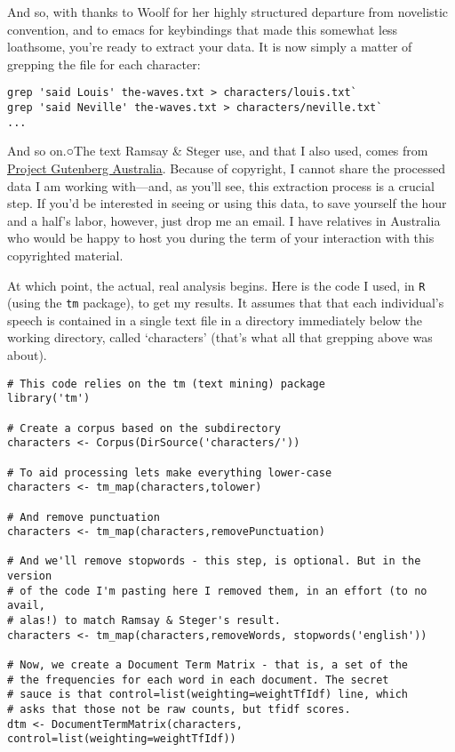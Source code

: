 \documentclass[
  12pt,
]{article}
\begin{document}
And so, with thanks to Woolf for her highly structured departure from
novelistic convention, and to emacs for keybindings that made this
somewhat less loathsome, you're ready to extract your data. It is now
simply a matter of grepping the file for each character:

\begin{verbatim}
grep 'said Louis' the-waves.txt > characters/louis.txt`
grep 'said Neville' the-waves.txt > characters/neville.txt`
...
\end{verbatim}

And so on.○{The text Ramsay \& Steger use, and that I also used, comes
from \href{http://gutenberg.net.au/pages/woolf.html}{Project Gutenberg
Australia}. Because of copyright, I cannot share the processed data I am
working with---and, as you'll see, this extraction process is a crucial
step. If you'd be interested in seeing or using this data, to save
yourself the hour and a half's labor, however, just drop me an email. I
have relatives in Australia who would be happy to host you during the
term of your interaction with this copyrighted material.}

At which point, the actual, real analysis begins. Here is the code I
used, in \texttt{R} (using the \texttt{tm} package), to get my results.
It assumes that that each individual's speech is contained in a single
text file in a directory immediately below the working directory, called
`characters' (that's what all that grepping above was about).

\begin{verbatim}
# This code relies on the tm (text mining) package
library('tm')

# Create a corpus based on the subdirectory
characters <- Corpus(DirSource('characters/'))

# To aid processing lets make everything lower-case
characters <- tm_map(characters,tolower)

# And remove punctuation
characters <- tm_map(characters,removePunctuation)

# And we'll remove stopwords - this step, is optional. But in the version 
# of the code I'm pasting here I removed them, in an effort (to no avail, 
# alas!) to match Ramsay & Steger's result.
characters <- tm_map(characters,removeWords, stopwords('english'))

# Now, we create a Document Term Matrix - that is, a set of the
# the frequencies for each word in each document. The secret
# sauce is that control=list(weighting=weightTfIdf) line, which
# asks that those not be raw counts, but tfidf scores.
dtm <- DocumentTermMatrix(characters,   control=list(weighting=weightTfIdf))
\end{verbatim}
\end{document}
